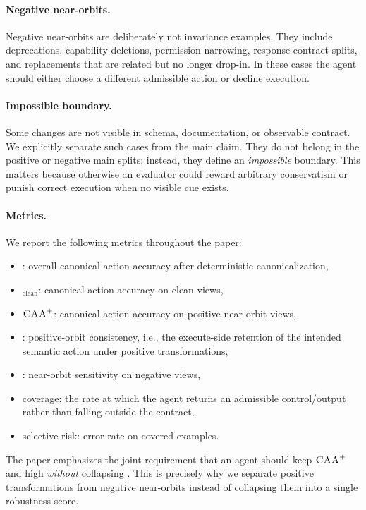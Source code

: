 \paragraph{Negative near-orbits.}
Negative near-orbits are deliberately not invariance examples. They include deprecations, capability deletions, permission narrowing, response-contract splits, and replacements that are related but no longer drop-in. In these cases the agent should either choose a different admissible action or decline execution.

\paragraph{Impossible boundary.}
Some changes are not visible in schema, documentation, or observable contract. We explicitly separate such cases from the main claim. They do not belong in the positive or negative main splits; instead, they define an \emph{impossible} boundary. This matters because otherwise an evaluator could reward arbitrary conservatism or punish correct execution when no visible cue exists.

\paragraph{Metrics.}
We report the following metrics throughout the paper:
\begin{itemize}[leftmargin=1.5em]
    \item \CAA: overall canonical action accuracy after deterministic canonicalization,
    \item \CAA{}$_\text{clean}$: canonical action accuracy on clean views,
    \item $\textsc{CAA}^{+}$: canonical action accuracy on positive near-orbit views,
    \item \POC: positive-orbit consistency, i.e., the execute-side retention of the intended semantic action under positive transformations,
    \item \NOS: near-orbit sensitivity on negative views,
    \item coverage: the rate at which the agent returns an admissible control/output rather than falling outside the contract,
    \item selective risk: error rate on covered examples.
\end{itemize}
The paper emphasizes the joint requirement that an agent should keep $\textsc{CAA}^{+}$ and \POC{} high \emph{without} collapsing \NOS{}. This is precisely why we separate positive transformations from negative near-orbits instead of collapsing them into a single robustness score.
